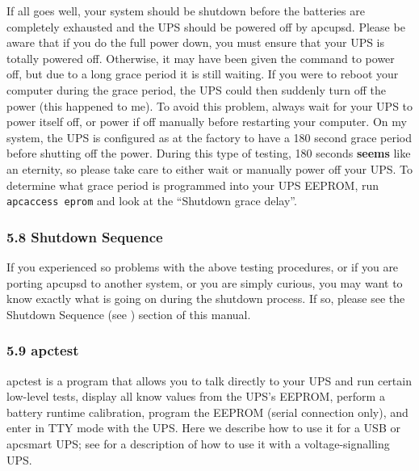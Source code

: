 If all goes well, your system should be shutdown before the batteries are
completely exhausted and the UPS should be powered off by apcupsd. Please be
aware that if you do the full power down, you must ensure that your UPS is
totally powered off.  Otherwise, it may have been given the command to power
off, but due to a long grace period it is still waiting. If you were to reboot
your computer during the grace period, the UPS could then suddenly turn off
the power (this happened to me). To avoid this problem, always wait for your
UPS to power itself off, or power if off manually before restarting your
computer. On my system, the UPS is configured as at the factory to have a 180
second grace period before shutting off the power. During this type of
testing, 180 seconds {\bf seems} like an eternity, so please take care to
either wait or manually power off your UPS. To determine what grace period is
programmed into your UPS EEPROM, run {\tt apcaccess eprom} and look at the
``Shutdown grace delay''. 

\label{Shutdown-Sequence}

\subsubsection*{5.8 Shutdown Sequence}

\label{index-Shutdown-Sequence-99}
If you experienced so problems with the above testing procedures, or if you
are porting apcupsd to another system, or you are simply curious, you may want
to know exactly what is going on during the shutdown process. If so, please
see the Shutdown Sequence (see 
) section of this
manual. 

\label{apctest}

\subsubsection*{5.9 apctest}

\label{index-apctest-100}
apctest is a program that allows you to talk directly to your UPS and run
certain low-level tests, display all know values from the UPS's EEPROM,
perform a battery runtime calibration, program the EEPROM (serial connection
only), and enter in TTY mode with the UPS. Here we describe how to use it for
a USB or apcsmart UPS; see 
 for a description
of how to use it with a voltage-signalling UPS.  

